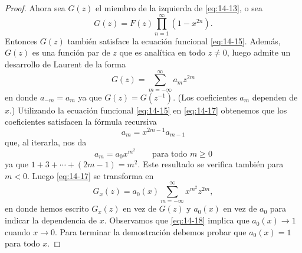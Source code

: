 \begin{proof}
        Ahora sea $G(z)$ el miembro de la izquierda de \eqref{eq:14-13}, o sea
        \begin{equation}\label{eq:14-16}
            G(z)=F(z)\prod_{n=1}^{\infty}(1-x^{2n}).
        \end{equation}
        Entonces $G(z)$ también satisface la ecuación funcional \eqref{eq:14-15}. Además, $G(z)$
        es una función par de $z$ que es analítica en todo $z\neq0$, luego admite un desarrollo
        de Laurent de la forma
        \begin{equation}\label{eq:14-17}
            G(z)=\sum_{m=-\infty}^{\infty}a_mz^{2m}
        \end{equation}
        en donde $a_{-m}=a_m$ ya que $G(z)=G(z^{-1})$. (Los coeficientes $a_m$ dependen de $x$.)
        Utilizando la ecuación funcional \eqref{eq:14-15} en \eqref{eq:14-17} obtenemos que los
        coeficientes satisfacen la fórmula recursiva
        \begin{equation*}
            a_m=x^{2m-1}a_{m-1}
        \end{equation*}
        que, al iterarla, nos da
        \begin{equation*}
            a_m=a_0x^{m^2}\qquad\text{para todo }m\geq0
        \end{equation*}
        ya que $1+3+\cdots+(2m-1)=m^2$. Este resultado se verifica también para $m<0$. Luego
        \eqref{eq:14-17} se transforma en
        \begin{equation}\label{eq:14-18}
            G_x(z)=a_0(x)\sum_{m=-\infty}^{\infty}x^{m^2}z^{2m},
        \end{equation}
        en donde hemos escrito $G_x(z)$ en vez de $G(z)$ y $a_0(x)$ en vez de $a_0$ para indicar
        la dependencia de $x$. Observamos que \eqref{eq:14-18} implica que $a_0(x)\to1$ cuando
        $x\to0$. Para terminar la demostración debemos probar que $a_0(x)=1$ para todo $x$.


\end{proof}
